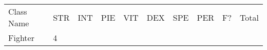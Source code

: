 \documentclass[12pt]{article}
\begin{document}
\begin{longtable}[]{@{}llllllllll@{}}
\toprule
\begin{minipage}[t]{0.13\columnwidth}\raggedright\strut
Class Name
\strut\end{minipage} &
\begin{minipage}[t]{0.06\columnwidth}\raggedright\strut
STR
\strut\end{minipage} &
\begin{minipage}[t]{0.06\columnwidth}\raggedright\strut
INT
\strut\end{minipage} &
\begin{minipage}[t]{0.06\columnwidth}\raggedright\strut
PIE
\strut\end{minipage} &
\begin{minipage}[t]{0.06\columnwidth}\raggedright\strut
VIT
\strut\end{minipage} &
\begin{minipage}[t]{0.06\columnwidth}\raggedright\strut
DEX
\strut\end{minipage} &
\begin{minipage}[t]{0.06\columnwidth}\raggedright\strut
SPE
\strut\end{minipage} &
\begin{minipage}[t]{0.06\columnwidth}\raggedright\strut
PER
\strut\end{minipage} &
\begin{minipage}[t]{0.07\columnwidth}\raggedright\strut
F?
\strut\end{minipage} &
\begin{minipage}[t]{0.08\columnwidth}\raggedright\strut
Total
\strut\end{minipage}\tabularnewline
\begin{minipage}[t]{0.13\columnwidth}\raggedright\strut
Fighter
\strut\end{minipage} &
\begin{minipage}[t]{0.06\columnwidth}\raggedright\strut
4
\strut\end{minipage} &
\begin{minipage}[t]{0.06\columnwidth}\raggedright\strut
\strut\end{minipage} &
\begin{minipage}[t]{0.06\columnwidth}\raggedright\strut
\strut\end{minipage} &
\begin{minipage}[t]{0.06\columnwidth}\raggedright\strut
\strut\end{minipage} &
\begin{minipage}[t]{0.06\columnwidth}\raggedright\strut

\end{minipage}
\end{longtable}
\end{document}
